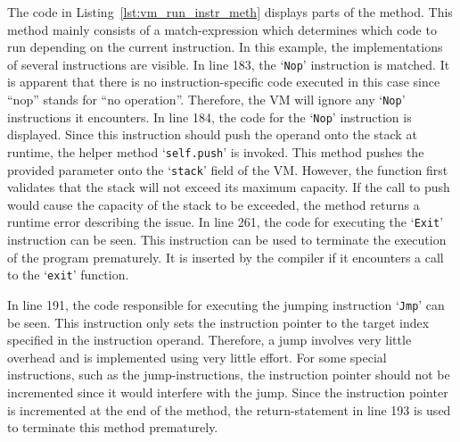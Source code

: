 
The code in Listing~\ref{lst:vm_run_instr_meth} displays parts of the  method.
This method mainly consists of a match-expression which determines which code to run depending on the current instruction.
In this example, the implementations of several instructions are visible.
In line 183, the `\texttt{Nop}' instruction is matched.
It is apparent that there is no instruction-specific code executed in this case since \enquote{nop} stands for \enquote{no operation}.
Therefore, the VM will ignore any `\texttt{Nop}' instructions it encounters.
In line 184, the code for the `\texttt{Nop}' instruction is displayed.
Since this instruction should push the operand onto the stack at runtime, the helper method `\texttt{self.push}' is invoked.
This method pushes the provided parameter onto the `\texttt{stack}' field of the VM\@.
However, the function first validates that the stack will not exceed its maximum capacity.
If the call to push would cause the capacity of the stack to be exceeded, the method returns a runtime error describing the issue.
In line 261, the code for executing the `\texttt{Exit}' instruction can be seen.
This instruction can be used to terminate the execution of the program prematurely.
It is inserted by the compiler if it encounters a call to the `\texttt{exit}' function.

In line 191, the code responsible for executing the jumping instruction `\texttt{Jmp}' can be seen.
This instruction only sets the instruction pointer to the target index specified in the instruction operand.
Therefore, a jump involves very little overhead and is implemented using very little effort.
For some special instructions, such as the jump-instructions, the instruction pointer should not be incremented since it would interfere with the jump.
Since the instruction pointer is incremented at the end of the method, the return-statement in line 193 is used to terminate this method prematurely.

